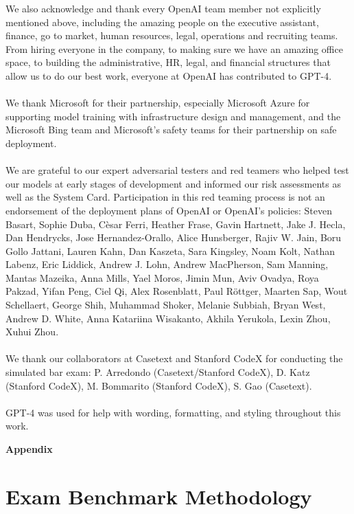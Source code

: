 \documentclass{article}
\begin{document}
We also acknowledge and thank every OpenAI team member not explicitly mentioned above, including the amazing people on the executive assistant, finance, go to market, human resources, legal, operations and recruiting teams. From hiring everyone in the company, to making sure we have an amazing office space, to building the administrative, HR, legal, and financial structures that allow us to do our best work, everyone at OpenAI has contributed to GPT-4.
\\
\\
We thank Microsoft for their partnership, especially Microsoft Azure for supporting model training with infrastructure design and management, and the Microsoft Bing team and Microsoft's safety teams for their partnership on safe deployment.
\\
\\
We are grateful to our expert adversarial testers and red teamers who helped test our models at early stages of development and informed our risk assessments as well as the System Card. Participation in this red teaming process is not an endorsement of the deployment plans of OpenAI or OpenAI's policies: Steven Basart, Sophie Duba, C\`esar Ferri, Heather Frase, Gavin Hartnett, Jake J. Hecla, Dan Hendrycks, Jose Hernandez-Orallo, Alice Hunsberger, Rajiv W. Jain, Boru Gollo Jattani, Lauren Kahn, Dan Kaszeta, Sara Kingsley, Noam Kolt, Nathan Labenz, Eric Liddick, Andrew J. Lohn, Andrew MacPherson, Sam Manning, Mantas Mazeika, Anna Mills, Yael Moros, Jimin Mun, Aviv Ovadya, Roya Pakzad, Yifan Peng, Ciel Qi, Alex Rosenblatt, Paul R\"ottger, Maarten Sap, Wout Schellaert, George Shih, Muhammad Shoker, Melanie Subbiah, Bryan West, Andrew D. White, Anna Katariina Wisakanto, Akhila Yerukola, Lexin Zhou, Xuhui Zhou.
\\
\\
We thank our collaborators at Casetext and Stanford CodeX for conducting the simulated bar exam: P. Arredondo (Casetext/Stanford CodeX), D. Katz (Stanford CodeX), M. Bommarito (Stanford CodeX), S. Gao (Casetext).
\\
\\
GPT-4 was used for help with wording, formatting, and styling throughout this work.

{}


\newpage
\begin{center}
\textbf{Appendix}    
\end{center}
\appendix
\section{Exam Benchmark Methodology}
\label{appendix:exam_methodology}
\end{document}

